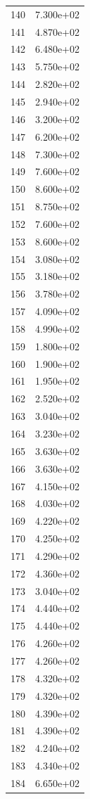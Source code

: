 \documentclass[12pt]{article}
\begin{document}
\begin{longtable}{@{}cc@{}}
140 & 7.300e+02 \\
141 & 4.870e+02 \\
142 & 6.480e+02 \\
143 & 5.750e+02 \\
144 & 2.820e+02 \\
145 & 2.940e+02 \\
146 & 3.200e+02 \\
147 & 6.200e+02 \\
148 & 7.300e+02 \\
149 & 7.600e+02 \\
150 & 8.600e+02 \\
151 & 8.750e+02 \\
152 & 7.600e+02 \\
153 & 8.600e+02 \\
154 & 3.080e+02 \\
155 & 3.180e+02 \\
156 & 3.780e+02 \\
157 & 4.090e+02 \\
158 & 4.990e+02 \\
159 & 1.800e+02 \\
160 & 1.900e+02 \\
161 & 1.950e+02 \\
162 & 2.520e+02 \\
163 & 3.040e+02 \\
164 & 3.230e+02 \\
165 & 3.630e+02 \\
166 & 3.630e+02 \\
167 & 4.150e+02 \\
168 & 4.030e+02 \\
169 & 4.220e+02 \\
170 & 4.250e+02 \\
171 & 4.290e+02 \\
172 & 4.360e+02 \\
173 & 3.040e+02 \\
174 & 4.440e+02 \\
175 & 4.440e+02 \\
176 & 4.260e+02 \\
177 & 4.260e+02 \\
178 & 4.320e+02 \\
179 & 4.320e+02 \\
180 & 4.390e+02 \\
181 & 4.390e+02 \\
182 & 4.240e+02 \\
183 & 4.340e+02 \\
184 & 6.650e+02 \\

\end{longtable}
\end{document}
